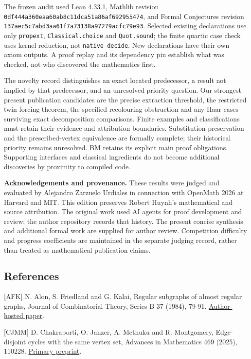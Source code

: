 \documentclass[
  11pt,
]{article}
\begin{document}
The frozen audit used Lean 4.33.1, Mathlib revision
\texttt{0df444a360eaa60ab8c11dca51a86af692955474}, and Formal
Conjectures revision \texttt{137aec5c7abd3aa61f7a73138a97279acfc79e93}.
Selected existing declarations use only \texttt{propext},
\texttt{Classical.choice} and \texttt{Quot.sound}; the finite quartic
case check uses kernel reduction, not \texttt{native\_decide}. New
declarations have their own axiom outputs. A proof replay and its
dependency pin establish what was checked, not who discovered the
mathematics first.

The novelty record distinguishes an exact located predecessor, a result
not implied by that predecessor, and an unresolved priority question.
Our strongest present publication candidates are the precise extraction
threshold, the restricted twin-forcing theorem, the specified
recolouring obstruction and any Haar cases surviving exact decomposition
comparisons. Finite examples and classifications must retain their
evidence and attribution boundaries. Substitution preservation and the
prescribed-vertex equivalence are formally complete; their historical
priority remains unresolved. BM retains its explicit main proof
obligations. Supporting interfaces and classical ingredients do not
become additional discoveries by proximity to compiled code.

\textbf{Acknowledgements and provenance.} These results were judged and
evaluated by Alejandro Zarzuelo Urdiales in connection with OpenMath
2026 at Harvard and MIT. This edition preserves Robert Huynh's
mathematical and source attribution. The original work used AI agents
for proof development and review; the author repository records that
history. The present concise synthesis and additional formal work are
supplied for author review. Competition difficulty and progress
coefficients are maintained in the separate judging record, rather than
treated as mathematical publication claims.

\subsection{References}\label{references}

{[}AFK{]} N. Alon, S. Friedland and G. Kalai, Regular subgraphs of
almost regular graphs, Journal of Combinatorial Theory, Series B 37
(1984), 79-91.
\href{https://web.math.princeton.edu/~nalon/PDFS/Publications/Regular\%20subgraphs\%20of\%20almost\%20regular\%20graphs.pdf}{Author-hosted
paper}.

{[}CJMM{]} D. Chakraborti, O. Janzer, A. Methuku and R. Montgomery,
Edge-disjoint cycles with the same vertex set, Advances in Mathematics
469 (2025), 110228. \href{https://arxiv.org/abs/2404.07190}{Primary
preprint}.
\end{document}
